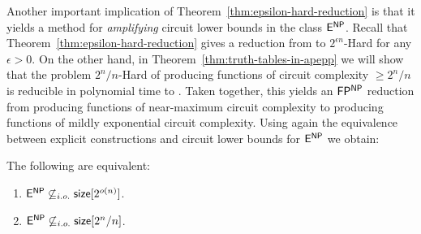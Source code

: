 


Another important implication of Theorem~\ref{thm:epsilon-hard-reduction} is that it yields a method for \emph{amplifying} circuit lower bounds in the class $\cl{E^{NP}}$. Recall that Theorem~\ref{thm:epsilon-hard-reduction} gives a reduction from \avoid to {\sc $2^{\epsilon n}$-Hard} for any $\epsilon > 0$. On the other hand, in Theorem~\ref{thm:truth-tables-in-apepp} we will show that the problem {\sc $2^n/n$-Hard} of producing functions of circuit complexity $\geq 2^n/n$ is reducible in polynomial time to \avoid. Taken together, this yields an $\cl{FP^{NP}}$ reduction from producing functions of near-maximum circuit complexity to producing functions of mildly exponential circuit complexity. Using again the equivalence between explicit constructions and circuit lower bounds for $\cl{E^{NP}}$  we obtain:

\begin{theorem*}
The following are equivalent:
\begin{enumerate}
    \item $\cl{E^{NP}} \not\subseteq_{i.o.} \cl{size}[2^{o(n)}]$.
    \item  $\cl{E^{NP}} \not\subseteq_{i.o.} \cl{size}[2^{n}/n]$.
\end{enumerate}
\end{theorem*}



